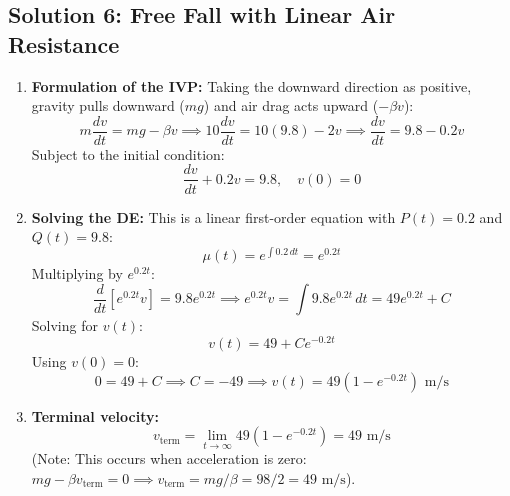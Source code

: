 \documentclass[11pt,letterpaper]{article}
\begin{document}
\subsection*{Solution 6: Free Fall with Linear Air Resistance}
\begin{enumerate}[label=(\alph*)]
    \item \textbf{Formulation of the IVP:}
    Taking the downward direction as positive, gravity pulls downward ($mg$) and air drag acts upward ($-\beta v$):
    \[ m \frac{dv}{dt} = mg - \beta v \implies 10 \frac{dv}{dt} = 10(9.8) - 2v \implies \frac{dv}{dt} = 9.8 - 0.2 v \]
    Subject to the initial condition:
    \[ \frac{dv}{dt} + 0.2 v = 9.8, \quad v(0) = 0 \]

    \item \textbf{Solving the DE:}
    This is a linear first-order equation with $P(t) = 0.2$ and $Q(t) = 9.8$:
    \[ \mu(t) = e^{\int 0.2 \, dt} = e^{0.2t} \]
    Multiplying by $e^{0.2t}$:
    \[ \frac{d}{dt}\left[ e^{0.2t} v \right] = 9.8 e^{0.2t} \implies e^{0.2t} v = \int 9.8 e^{0.2t} \, dt = 49 e^{0.2t} + C \]
    Solving for $v(t)$:
    \[ v(t) = 49 + C e^{-0.2t} \]
    Using $v(0) = 0$:
    \[ 0 = 49 + C \implies C = -49 \implies v(t) = 49(1 - e^{-0.2t}) \text{ m/s} \]

    \item \textbf{Terminal velocity:}
    \[ v_{\text{term}} = \lim_{t \to \infty} 49(1 - e^{-0.2t}) = 49 \text{ m/s} \]
    (Note: This occurs when acceleration is zero: $mg - \beta v_{\text{term}} = 0 \implies v_{\text{term}} = mg/\beta = 98/2 = 49\text{ m/s}$).
\end{enumerate}
\end{document}
